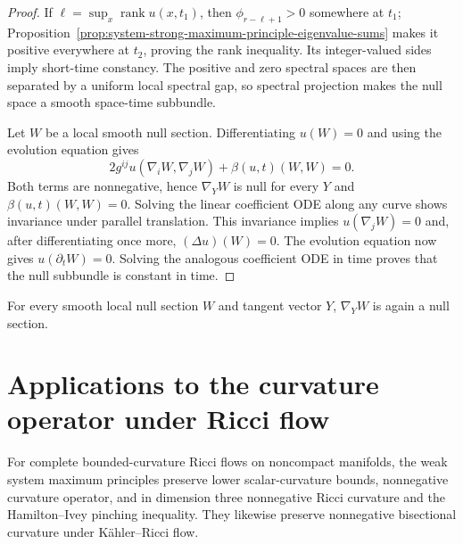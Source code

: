 \begin{proof}
\sketch
{}
If $\ell=\sup_x\operatorname{rank}u(x,t_1)$, then
$\phi_{r-\ell+1}>0$ somewhere at $t_1$; Proposition~\ref{prop:system-strong-maximum-principle-eigenvalue-sums}
makes it positive everywhere at $t_2$, proving the rank inequality.  Its
integer-valued sides imply short-time constancy.  The positive and zero
spectral spaces are then separated by a uniform local spectral gap, so
spectral projection makes the null space a smooth space-time subbundle.

Let $W$ be a local smooth null section.  Differentiating $u(W)=0$ and using
the evolution equation gives
\[
2g^{ij}u(\nabla_iW,\nabla_jW)+\beta(u,t)(W,W)=0.
\]
Both terms are nonnegative, hence $\nabla_YW$ is null for every $Y$ and
$\beta(u,t)(W,W)=0$.  Solving the linear coefficient ODE along any curve
shows invariance under parallel translation.  This invariance implies
$u(\nabla_jW)=0$ and, after differentiating once more,
$(\Delta u)(W)=0$.  The evolution equation now gives
$u(\partial_tW)=0$.  Solving the analogous coefficient ODE in time proves
that the null subbundle is constant in time.
\end{proof}

\begin{remark}
\label{rem:null-space-infinitesimal-parallel-invariance}
For every smooth local null section $W$ and tangent vector $Y$,
$\nabla_YW$ is again a null section.
\end{remark}

\section{Applications to the curvature operator under Ricci flow}

\begin{remark}
\label{rem:noncompact-ricci-flow-curvature-consequences}
For complete bounded-curvature Ricci flows on noncompact manifolds, the weak
system maximum principles preserve lower scalar-curvature bounds,
nonnegative curvature operator, and in dimension three nonnegative Ricci
curvature and the Hamilton--Ivey pinching inequality.  They likewise preserve
nonnegative bisectional curvature under K\"ahler--Ricci flow.
\end{remark}

